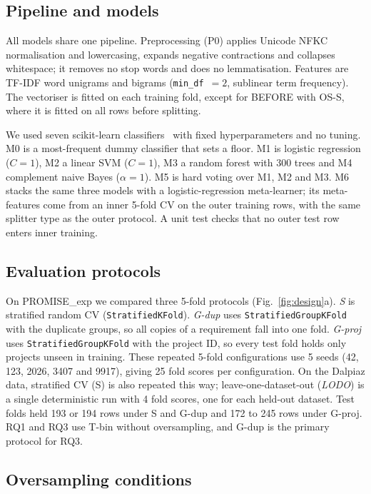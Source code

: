 \subsection{Pipeline and models}

All models share one pipeline. Preprocessing (P0) applies Unicode NFKC normalisation and lowercasing, expands negative contractions and collapses whitespace; it removes no stop words and does no lemmatisation. Features are TF-IDF word unigrams and bigrams (\texttt{min\_df}~$=2$, sublinear term frequency). The vectoriser is fitted on each training fold, except for BEFORE with OS-S, where it is fitted on all rows before splitting.

We used seven scikit-learn classifiers~\cite{pedregosa2011} with fixed hyperparameters and no tuning. M0 is a most-frequent dummy classifier that sets a floor. M1 is logistic regression ($C=1$), M2 a linear SVM ($C=1$), M3 a random forest with 300 trees and M4 complement naive Bayes ($\alpha=1$). M5 is hard voting over M1, M2 and M3. M6 stacks the same three models with a logistic-regression meta-learner; its meta-features come from an inner 5-fold CV on the outer training rows, with the same splitter type as the outer protocol. A unit test checks that no outer test row enters inner training.

\subsection{Evaluation protocols}

On PROMISE\_exp we compared three 5-fold protocols (Fig.~\ref{fig:design}a). \emph{S} is stratified random CV (\texttt{StratifiedKFold}). \emph{G-dup} uses \texttt{StratifiedGroupKFold} with the duplicate groups, so all copies of a requirement fall into one fold. \emph{G-proj} uses \texttt{StratifiedGroupKFold} with the project ID, so every test fold holds only projects unseen in training. These repeated 5-fold configurations use 5 seeds (42, 123, 2026, 3407 and 9917), giving 25 fold scores per configuration. On the Dalpiaz data, stratified CV (S) is also repeated this way; leave-one-dataset-out (\emph{LODO}) is a single deterministic run with 4 fold scores, one for each held-out dataset. Test folds held 193 or 194 rows under S and G-dup and 172 to 245 rows under G-proj. RQ1 and RQ3 use T-bin without oversampling, and G-dup is the primary protocol for RQ3.

\subsection{Oversampling conditions}


